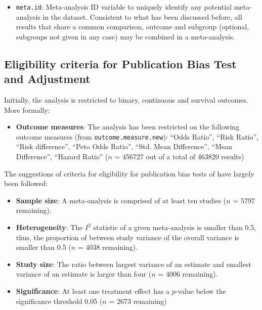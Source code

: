 \documentclass[11pt,a4paper,twoside]{book}\usepackage[]{graphicx}\usepackage[]{color}
\begin{document}
\begin{itemize}
\item \texttt{meta.id}: Meta-analysis ID variable to uniquely identify any potential meta-analysis in the dataset. Consistent to what has been discussed before, all results that share a common comparison, outcome and subgroup (optional, subgroups not given in any case) may be combined in a meta-analysis.
\end{itemize}


\subsection{Eligibility criteria for Publication Bias Test and Adjustment} 
Initially, the analysis is restricted to binary, continuous and survival outcomes. More formally:
\begin{itemize}
\item \textbf{Outcome measures}: The analysis has been restricted on the following outcome measures (from \texttt{outcome.measure.new}): ``Odds Ratio'', ``Risk Ratio'', ``Risk difference'', ``Peto Odds Ratio'', ``Std. Mean Difference'', ``Mean Difference'', ``Hazard Ratio'' 
($n$ = 456727 out of a total of 463820 results)
\end{itemize}

The suggestions of criteria for eligibility for publication bias tests of \citet{Ioannidis2007} have largely been followed:
\begin{itemize}
\item \textbf{Sample size}: A meta-analysis is comprised of at least ten studies ($n$ = 5797 remaining). 
\item \textbf{Heterogeneity}: The $I^2$ statistic of a given meta-analysis is smaller than 0.5, thus, the proportion of between study variance of the overall variance is smaller than 0.5 ($n$ = 4038 remaining).
\item \textbf{Study size}: The ratio between largest variance of an estimate and smallest variance of an estimate is larger than four ($n$ = 4006 remaining).
\item \textbf{Significance}: At least one treatment effect has a $p$-value below the significance threshold 0.05 ($n$ = 2673 remaining)
\end{itemize}
\end{document}

